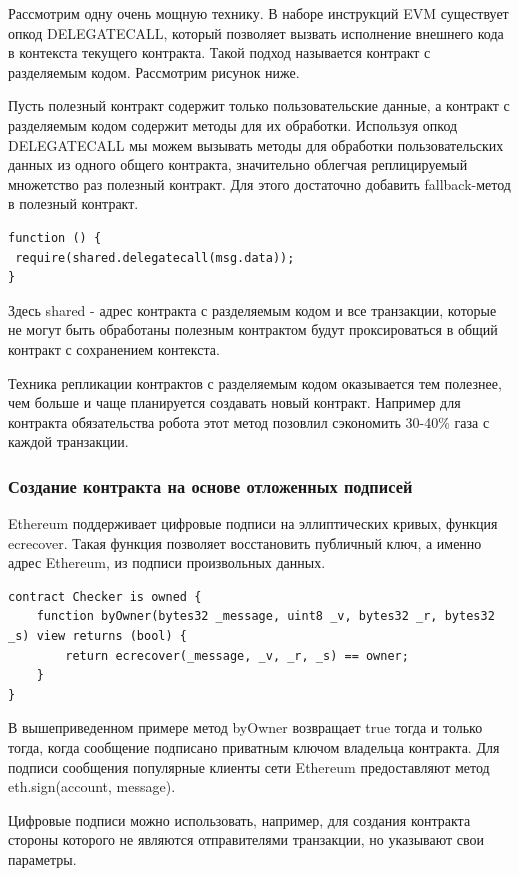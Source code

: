 \documentclass{article}
\begin{document}
Рассмотрим одну очень мощную технику. В наборе инструкций EVM существует опкод DELEGATECALL, который позволяет вызвать исполнение внешнего кода в контекста текущего контракта. Такой подход называется контракт с разделяемым кодом. Рассмотрим рисунок ниже.

Пусть полезный контракт содержит только пользовательские данные, а контракт с разделяемым кодом содержит методы для их обработки. Используя опкод DELEGATECALL мы можем вызывать методы для обработки пользовательских данных из одного общего контракта, значительно облегчая реплицируемый множетство раз полезный контракт. Для этого достаточно добавить fallback-метод в полезный контракт.

\begin{lstlisting}
function () {
 require(shared.delegatecall(msg.data));
}
\end{lstlisting}

Здесь shared - адрес контракта с разделяемым кодом и все транзакции, которые не могут быть обработаны полезным контрактом будут проксироваться в общий контракт с сохранением контекста.

Техника репликации контрактов с разделяемым кодом оказывается тем полезнее, чем больше и чаще планируется создавать новый контракт. Например для контракта обязательства робота этот метод позовлил сэкономить 30-40\% газа с каждой транзакции.

\subsubsection{Создание контракта на основе отложенных подписей}

Ethereum поддерживает цифровые подписи на эллиптических кривых, функция ecrecover. Такая функция позволяет восстановить публичный ключ, а именно адрес Ethereum, из подписи произвольных данных.

\begin{lstlisting}
contract Checker is owned {
    function byOwner(bytes32 _message, uint8 _v, bytes32 _r, bytes32 _s) view returns (bool) {
        return ecrecover(_message, _v, _r, _s) == owner;
    }
}
\end{lstlisting}

В вышеприведенном примере метод byOwner возвращает true тогда и только тогда, когда сообщение подписано приватным ключом владельца контракта. Для подписи сообщения популярные клиенты сети Ethereum предоставляют метод eth.sign(account, message).

Цифровые подписи можно использовать, например, для создания контракта стороны которого не являются отправителями транзакции, но указывают свои параметры.
\end{document}
